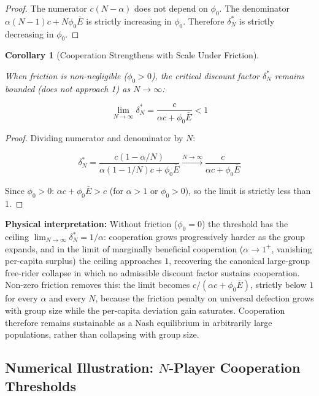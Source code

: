 \documentclass[11pt]{article}
\theoremstyle{plain}
\newtheorem{corollary}[theorem]{Corollary}
\theoremstyle{definition}
\theoremstyle{remark}
\let\origsubsection\subsection
\renewcommand{\subsection}{\needspace{7\baselineskip}\origsubsection}
\begin{document}
\begin{proof}
The numerator $c(N - \alpha)$ does not depend on $\phi_0$. The denominator $\alpha(N-1)c + N\phi_0\bar{E}$ is strictly increasing in $\phi_0$. Therefore $\delta_N^*$ is strictly decreasing in $\phi_0$.
\end{proof}

\begin{corollary}[Cooperation Strengthens with Scale Under Friction]
\label{cor-cooperation-strengthens-scale}

When friction is non-negligible ($\phi_0 > 0$), the critical discount factor $\delta_N^*$ remains bounded (does not approach 1) as $N \to \infty$:

$$\lim_{N \to \infty} \delta_N^* = \frac{c}{\alpha c + \phi_0 \bar{E}} < 1$$
\end{corollary}

\begin{proof}
Dividing numerator and denominator by $N$:

$$\delta_N^* = \frac{c(1 - \alpha/N)}{\alpha(1 - 1/N)c + \phi_0\bar{E}} \xrightarrow{N \to \infty} \frac{c}{\alpha c + \phi_0\bar{E}}$$

Since $\phi_0 > 0$: $\alpha c + \phi_0\bar{E} > c$ (for $\alpha > 1$ or $\phi_0 > 0$), so the limit is strictly less than 1.
\end{proof}

\textbf{Physical interpretation:} Without friction (\(\phi_0 = 0\)) the
threshold has the ceiling \(\lim_{N \to \infty} \delta_N^* = 1/\alpha\):
cooperation grows progressively harder as the group expands, and in the
limit of marginally beneficial cooperation (\(\alpha \to 1^+\),
vanishing per-capita surplus) the ceiling approaches \(1\), recovering
the canonical large-group free-rider collapse in which no admissible
discount factor sustains cooperation. Non-zero friction removes this:
the limit becomes \(c/(\alpha c + \phi_0 \bar{E})\), strictly below
\(1\) for every \(\alpha\) and every \(N\), because the friction penalty
on universal defection grows with group size while the per-capita
deviation gain saturates. Cooperation therefore remains sustainable as a
Nash equilibrium in arbitrarily large populations, rather than
collapsing with group size.

\subsection{\texorpdfstring{Numerical Illustration: \(N\)-Player
Cooperation
Thresholds}{Numerical Illustration: N-Player Cooperation Thresholds}}\label{n-player-cooperation-thresholds}
\end{document}
